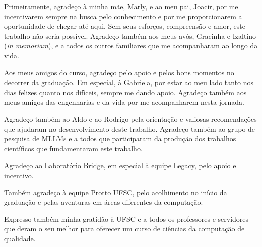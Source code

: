 \begin{agradecimentos}
    Primeiramente, agradeço à minha mãe, Marly, e ao meu pai, Joacir, por me incentivarem sempre na busca pelo
    conhecimento e por me proporcionarem a oportunidade de chegar até aqui. Sem seus esforços, compreensão e amor, este
    trabalho não seria possível. Agradeço também aos meus avós, Gracinha e Izaltino (\textit{in memoriam}), e a todos
    os outros familiares que me acompanharam ao longo da vida.

    Aos meus amigos do curso, agradeço pelo apoio e pelos bons momentos no decorrer da graduação. Em especial, à
    Gabriela, por estar ao meu lado tanto nos dias felizes quanto nos difíceis, sempre me dando apoio. Agradeço também
    aos meus amigos das engenharias e da vida por me acompanharem nesta jornada.

    Agradeço também ao Aldo e ao Rodrigo pela orientação e valiosas recomendações que ajudaram no desenvolvimento deste
    trabalho. Agradeço também ao grupo de pesquisa de MLLMs e a todos que participaram da produção dos trabalhos
    científicos que fundamentaram este trabalho.

    Agradeço ao Laboratório Bridge, em especial à equipe Legacy, pelo apoio e incentivo.

    Também agradeço à equipe Protto UFSC, pelo acolhimento no início da graduação e pelas aventuras em áreas diferentes
    da computação.

    Expresso também minha gratidão à UFSC e a todos os professores e servidores que deram o seu melhor para oferecer um
    curso de ciências da computação de qualidade.
\end{agradecimentos}
